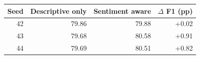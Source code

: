 \begin{tabular}{rrrr}
\toprule
Seed & Descriptive only & Sentiment aware & $\Delta$ F1 (pp) \\
\midrule
42 & 79.86 & 79.88 & +0.02 \\
43 & 79.68 & 80.58 & +0.91 \\
44 & 79.69 & 80.51 & +0.82 \\
\bottomrule
\end{tabular}
